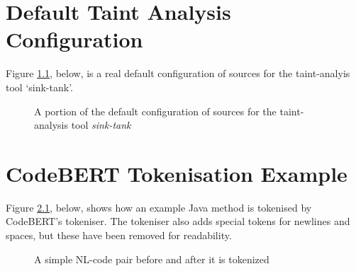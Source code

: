 \chapter{Default Taint Analysis Configuration}
\label{appendix:sources}


Figure \ref{sink-tank-default-source-config}, below, is a real default configuration of sources for the taint-analyis tool `sink-tank'. \\

\begin{figure}[H]

\caption{A portion of the default configuration of sources for the taint-analysis tool \emph{sink-tank}}
\label{sink-tank-default-source-config}
\end{figure}

\chapter{CodeBERT Tokenisation Example}
\label{appendix:tokenizer-example}
Figure \ref{tokenizer-example}, below, shows how an example Java method is tokenised by CodeBERT's tokeniser. The tokeniser also adds special tokens for newlines and spaces, but these have been removed for readability.\\

\begin{figure}[h]
    
    
    \caption{A simple NL-code pair before and after it is tokenized}
    \label{tokenizer-example}
\end{figure}

